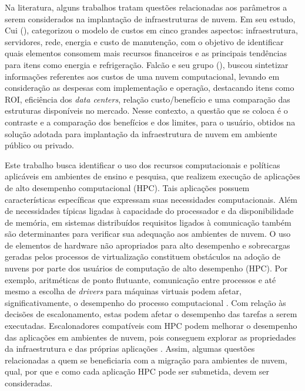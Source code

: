 \documentclass[tese,capa]{texufpel}
\begin{document}
Na literatura, alguns trabalhos tratam questões relacionadas aos parâmetros a serem considerados na implantação de infraestruturas de nuvem. Em seu estudo, Cui (\citeyear{cui_total_2017}), categorizou o modelo de custos em cinco grandes aspectos: infraestrutura, servidores, rede, energia e custo de manutenção, com o objetivo de identificar quais elementos consomem mais recursos financeiros e as principais tendências para itens como energia e refrigeração. Falcão e seu grupo (\citeyear{falcao_modelagem_2019}), buscou sintetizar informações referentes aos custos de uma nuvem computacional, levando em consideração as despesas com implementação e operação, destacando itens como ROI, eficiência dos \emph{data centers}, relação custo/benefício e uma comparação das estruturas disponíveis no mercado. Nesse contexto, a questão que se coloca é o contraste e a comparação dos benefícios e dos limites, para o usuário, obtidos na solução adotada para implantação da infraestrutura de nuvem em ambiente público ou privado. 

Este trabalho busca identificar o uso dos recursos computacionais e políticas aplicáveis em ambientes de ensino e pesquisa, que realizem execução de aplicações de alto desempenho computacional (HPC). Tais aplicações possuem características específicas que expressam suas necessidades computacionais. Além de necessidades típicas ligadas à capacidade do processador e da disponibilidade de memória, em sistemas distribuídos requisitos ligados à comunicação também são determinantes para verificar sua adequação aos ambientes de nuvem. O uso de elementos de hardware não apropriados para alto desempenho e sobrecargas geradas pelos processos de virtualização constituem obstáculos na adoção de nuvens por parte dos usuários de computação de alto desempenho (HPC). Por exemplo, aritméticas de ponto flutuante, comunicação entre processos e até mesmo a escolha de \emph{drivers} para máquinas virtuais podem afetar, significativamente, o desempenho do processo computacional \cite{aladyshev_variants_2018}. Com relação às decisões de escalonamento, estas podem afetar o desempenho das tarefas a serem executadas. Escalonadores compatíveis com HPC podem melhorar o desempenho das aplicações em ambientes de nuvem, pois conseguem explorar as propriedades da infraestrutura e das próprias aplicações \cite{netto_hpc_2018}. Assim, algumas questões relacionadas a quem se beneficiaria com a migração para ambientes de nuvem, qual, por que e como cada aplicação HPC pode ser submetida, devem ser consideradas.
\end{document}
